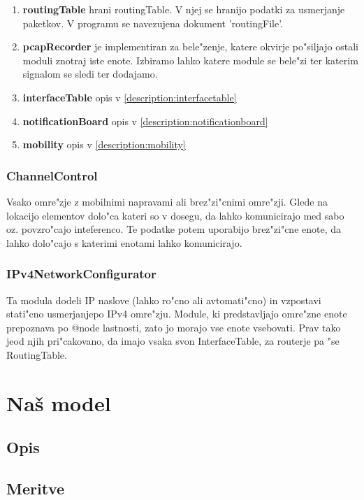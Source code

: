 \documentclass[a4paper,11pt]{article}
\begin{document}
\begin{enumerate}
    \item \textbf{routingTable} hrani routingTable. V njej se hranijo podatki za usmerjanje paketkov. V programu se navezujena dokument 'routingFile'.

    \item \textbf{pcapRecorder} je implementiran za bele"zenje, katere okvirje po"siljajo ostali moduli znotraj iste enote. Izbiramo lahko katere module se bele"zi ter katerim signalom se sledi ter dodajamo.

    \item \textbf{interfaceTable} opis v \ref{description:interfacetable}

    \item \textbf{notificationBoard} opis v \ref{description:notificationboard} 

    \item \textbf{mobility} opis v \ref{description:mobility}
\end{enumerate}




\subsubsection{ChannelControl}

Vsako omre"zje z mobilnimi napravami ali brez"zi"cnimi omre"zji. Glede na lokacijo elementov dolo"ca kateri so v dosegu, da lahko komunicirajo med sabo oz. povzro"cajo inteferenco. Te podatke potem uporabijo brez"zi"cne enote, da lahko dolo"cajo s katerimi enotami lahko komunicirajo.

\subsubsection{IPv4NetworkConfigurator}

Ta modula dodeli IP naslove (lahko ro"cno ali avtomati"cno) in vzpostavi stati"cno usmerjanjepo IPv4 omre"zju. Module, ki predstavljajo omre"zne enote prepoznava po @node lastnosti, zato jo morajo vse enote vsebovati. Prav tako jeod njih pri"cakovano, da imajo vsaka svon InterfaceTable, za routerje pa "se RoutingTable. 

\section{Na\v{s} model}


\subsection{Opis}

\subsection{Meritve}
\end{document}
